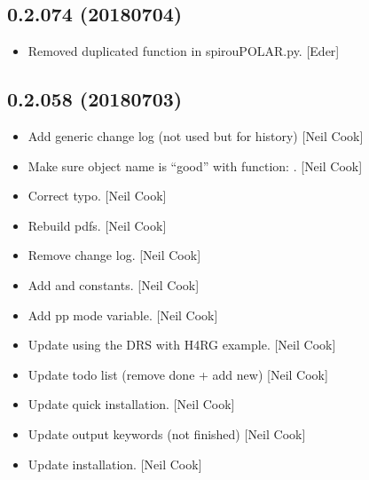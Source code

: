 \documentclass[a4paper,10pt,english]{report}
\begin{document}
\subsection{0.2.074 (2018\sphinxhyphen{}07\sphinxhyphen{}04)}
\label{\detokenize{misc/changelog:id422}}\begin{itemize}
\item {} 
Removed duplicated function  in spirouPOLAR.py.
{[}Eder{]}

\end{itemize}


\subsection{0.2.058 (2018\sphinxhyphen{}07\sphinxhyphen{}03)}
\label{\detokenize{misc/changelog:id423}}\begin{itemize}
\item {} 
Add generic change log (not used but for history) {[}Neil Cook{]}

\item {} 
Make sure object name is “good” with function: .
{[}Neil Cook{]}

\item {} 
Correct typo. {[}Neil Cook{]}

\item {} 
Rebuild pdfs. {[}Neil Cook{]}

\item {} 
Remove change log. {[}Neil Cook{]}

\item {} 
Add  and  constants. {[}Neil Cook{]}

\item {} 
Add pp mode variable. {[}Neil Cook{]}

\item {} 
Update using the DRS with H4RG example. {[}Neil Cook{]}

\item {} 
Update todo list (remove done + add new) {[}Neil Cook{]}

\item {} 
Update quick installation. {[}Neil Cook{]}

\item {} 
Update output keywords (not finished) {[}Neil Cook{]}

\item {} 
Update installation. {[}Neil Cook{]}


\end{itemize}
\end{document}
